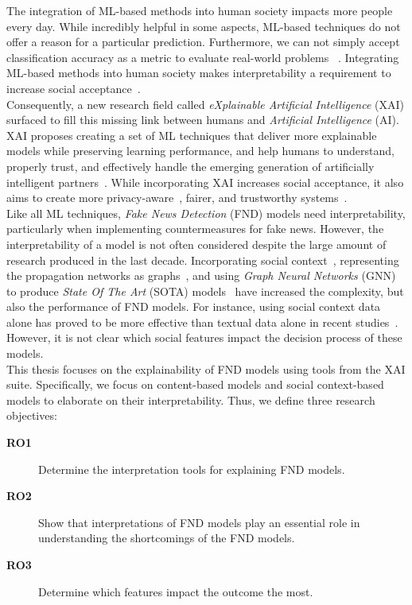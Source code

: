 The integration of ML-based methods into human society impacts more people every day. While incredibly helpful in some aspects,
ML-based techniques do not offer a reason for a particular prediction. Furthermore, we can not simply accept classification accuracy
as a metric to evaluate real-world problems ~\parencite{TowardsARigorousScienceML_Velez}. Integrating ML-based methods into human society
makes interpretability a requirement to increase social acceptance~\parencite{InterpretableMachineLearning_Molnar}.\\
Consequently, a new research field called \emph{eXplainable Artificial Intelligence} (XAI) surfaced to fill this missing link between humans and
\emph{Artificial Intelligence} (AI). XAI proposes creating a set of ML techniques that deliver more explainable models while preserving learning performance, and help humans to understand, properly trust, and effectively handle the emerging generation of artificially intelligent partners~\parencite{XAI_Gunning}. While incorporating XAI increases social acceptance, it also aims to create more privacy-aware~\parencite{SlaveToTheAlgorithm_EdwardsVeale}, fairer, and trustworthy systems~\parencite{TheMythosOfModelInterpretability_Lipton}.\\
Like all ML techniques, \emph{Fake News Detection} (FND) models need interpretability, particularly when implementing countermeasures for fake
news. However, the interpretability of a model is not often considered despite the large amount of research produced in the last decade.
Incorporating social context~\parencite{FakeNewsNet_Shu}, representing the propagation networks as graphs~\parencite{UPFD_Dataset_Shu},
and using \emph{Graph Neural Networks} (GNN) to produce \emph{State Of The Art} (SOTA) models~\parencite{FakeNewsDetectionUsingGeometricDeepLearning_Monti} have increased the complexity, but also the performance of FND models.
For instance, using social context data alone has proved to be more effective than textual data alone in recent studies~\parencite{UPFD_Dataset_Shu}. However, it is not clear which social features impact the decision process of these models.\\
This thesis focuses on the explainability of FND models using tools from the XAI suite. Specifically, we focus on content-based models and social context-based models to elaborate on their interpretability. Thus, we define three research objectives:
\begin{description}
    \item[\textbf{RO1}] Determine the interpretation tools for explaining FND models.
    \item[\textbf{RO2}] Show that interpretations of FND models play an essential role in understanding the shortcomings of the FND models.
    \item[\textbf{RO3}] Determine which features impact the outcome the most.
\end{description}
